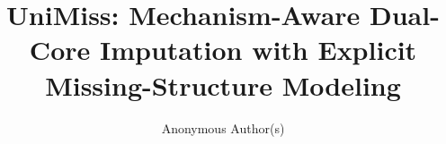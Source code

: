\documentclass[sigconf]{acmart}
\begin{document}
\title{UniMiss: Mechanism-Aware Dual-Core Imputation with Explicit Missing-Structure Modeling}

\author{Anonymous Author(s)}

\begin{abstract}

\end{abstract}


\maketitle










\end{document}
